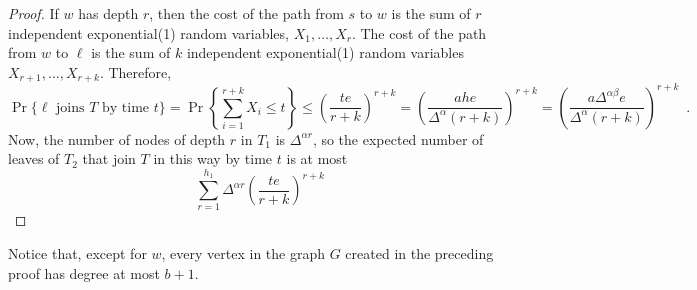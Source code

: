\documentclass{patmorin}
\begin{document}
\begin{proof}
  If $w$ has depth $r$, then the cost of the path from $s$ to $w$
  is the sum of $r$ independent exponential(1) random variables,
  $X_1,\ldots,X_r$.  The cost of the path from $w$ to $\ell$
  is the sum of $k$ independent exponential(1) random variables
  $X_{r+1},\ldots,X_{r+k}$.  Therefore,
  \[
    \Pr\{\text{$\ell$ joins $T$ by time $t$}\} =
    \Pr\left\{\sum_{i=1}^{r+k}X_i \le t\right\}
      \le \left(\frac{te}{r+k}\right)^{r+k}
      = \left(\frac{ahe}{\Delta^{\alpha}(r+k)}\right)^{r+k} 
      = \left(\frac{a\Delta^{\alpha\beta}e}{\Delta^{\alpha}(r+k)}\right)^{r+k} 
 \enspace .
  \]
  Now, the number of nodes of depth $r$ in $T_1$ is $\Delta^{\alpha r}$, so
  the expected number of leaves of $T_2$ that join $T$ in this way by time $t$
  is at most
  \[
      \sum_{r=1}^{h_1} \Delta^{\alpha r}\left(\frac{te}{r+k}\right)^{r+k}
  \]

\end{proof}


Notice that, except for $w$, every vertex in the graph $G$ created in
the preceding proof has degree at most $b+1$.  
\end{document}
